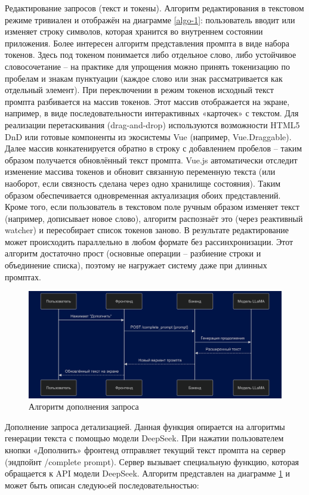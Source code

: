 Редактирование запросов (текст и токены). Алгоритм редактирования в текстовом режиме тривиален и отображён на диаграмме \ref{algo-1}: пользователь вводит или изменяет строку символов, которая хранится во внутреннем состоянии приложения. Более интересен алгоритм представления промпта в виде набора токенов. Здесь под токеном понимается либо отдельное слово, либо устойчивое словосочетание – на практике для упрощения можно принять токенизацию по пробелам и знакам пунктуации (каждое слово или знак рассматривается как отдельный элемент). При переключении в режим токенов исходный текст промпта разбивается на массив токенов. Этот массив отображается на экране, например, в виде последовательности интерактивных «карточек» с текстом. Для реализации перетаскивания (drag-and-drop) используются возможности HTML5 DnD или готовые компоненты из экосистемы Vue (например, Vue.Draggable). Далее массив конкатенируется обратно в строку с добавлением пробелов – таким образом получается обновлённый текст промпта. Vue.js автоматически отследит изменение массива токенов и обновит связанную переменную текста (или наоборот, если связность сделана через одно хранилище состояния). Таким образом обеспечивается одновременная актуализация обоих представлений. Кроме того, если пользователь в текстовом поле ручным образом изменяет текст (например, дописывает новое слово), алгоритм распознаёт это (через реактивный watcher) и пересобирает список токенов заново. В результате редактирование может происходить параллельно в любом формате без рассинхронизации. Этот алгоритм достаточно прост (основные операции – разбиение строки и объединение списка), поэтому не нагружает систему даже при длинных промптах.
\begin{figure}[htbp]
    \centering
    \includegraphics[width=1\textwidth]{picture/diploma-inter-algo-2.png}
    \caption{Алгоритм дополнения запроса}
    \label{algo-2}
\end{figure}
Дополнение запроса детализацией. Данная функция опирается на алгоритмы генерации текста с помощью модели DeepSeek. При нажатии пользователем кнопки «Дополнить» фронтенд отправляет текущий текст промпта на сервер (эндпойнт /complete prompt). Сервер вызывает специальную функцию, которая обращается к API модели DeepSeek. Алгоритм представлен на диаграмме \ref{algo-2} и может быть описан следуюoей последовательностью:
